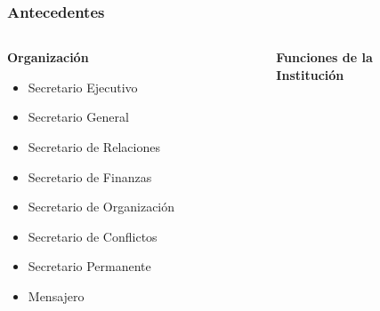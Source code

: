 \documentclass[xcolor=dvipsnames]{beamer}
\begin{document}
\begin{frame}
    \frametitle{Antecedentes}
    \begin{columns}
      \begin{column}{0.5\textwidth}
        \centering\textbf{\textcolor{color3}{Organización}}
        \vspace{3mm}
        \begin{itemize}
            \item Secretario Ejecutivo
            \item Secretario General
            \item Secretario de Relaciones
            \item Secretario de Finanzas
            \item Secretario de Organización
            \item Secretario de Conflictos
            \item Secretario Permanente
            \item Mensajero
         \end{itemize} 
      \end{column}
      \begin{column}{0.5\textwidth} 
        \centering\textbf{\textcolor{color3}{Funciones de la\\Institución}}
      \end{column}
    \end{columns}
\end{frame}
\end{document}
